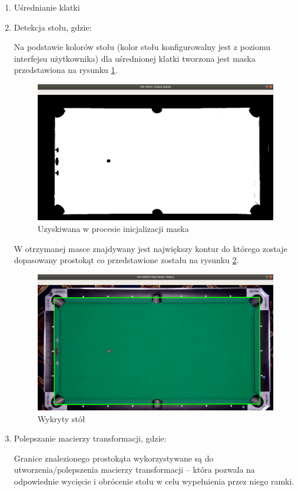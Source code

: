 \documentclass[12pt]{article}
\begin{document}
\begin{enumerate} [noitemsep]
    \item Uśrednianie klatki
    \item Detekcja stołu, gdzie:
    
    Na podstawie kolorów stołu (kolor stołu konfigurowalny jest z poziomu interfejsu użytkownika) dla uśrednionej klatki tworzona jest maska przedstawiona na rysunku \ref{pool_table_mask}.

    \begin{figure}[!ht]
        \centering
        \includegraphics[width=15cm]{./images/obrazki/inicjalizacja/pool_table_mask.png}
        \caption{Uzyskiwana w procesie inicjalizacji maska}
        \label{pool_table_mask}
    \end{figure}

    \newpage

	W otrzymanej masce znajdywany jest największy kontur do którego zostaje dopasowany prostokąt co przedstawione zostału na rysunku \ref{detected_pool_table}.

    \begin{figure}[!ht]
        \centering
        \includegraphics[width=15cm]{./images/obrazki/inicjalizacja/detected_pool_table.png}
        \caption{Wykryty stół}
        \label{detected_pool_table}
    \end{figure}

    \item Polepszanie macierzy transformacji, gdzie:

    Granice znalezionego prostokąta wykorzystywane są do utworzenia/polepszenia macierzy transformacji – która pozwala na odpowiednie wycięcie i obrócenie stołu w celu wypełnienia przez niego ramki.

\end{enumerate}
\end{document}
